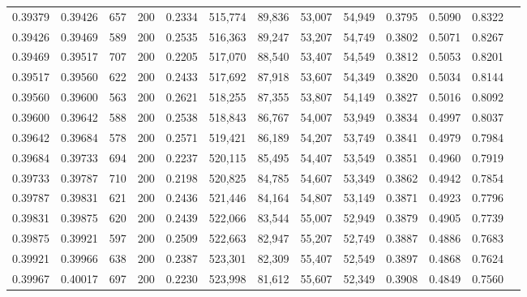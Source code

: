 \begin{tabular}{rrrrrrrrrrrrr}
0.39379 & 0.39426 &    657 & 200 &                                     0.2334 & 515,774 &  89,836 &  53,007 &  54,949 & 0.3795 & 0.5090 & 0.8322 \\
0.39426 & 0.39469 &    589 & 200 &                                     0.2535 & 516,363 &  89,247 &  53,207 &  54,749 & 0.3802 & 0.5071 & 0.8267 \\
0.39469 & 0.39517 &    707 & 200 &                                     0.2205 & 517,070 &  88,540 &  53,407 &  54,549 & 0.3812 & 0.5053 & 0.8201 \\
0.39517 & 0.39560 &    622 & 200 &                                     0.2433 & 517,692 &  87,918 &  53,607 &  54,349 & 0.3820 & 0.5034 & 0.8144 \\
0.39560 & 0.39600 &    563 & 200 &                                     0.2621 & 518,255 &  87,355 &  53,807 &  54,149 & 0.3827 & 0.5016 & 0.8092 \\
0.39600 & 0.39642 &    588 & 200 &                                     0.2538 & 518,843 &  86,767 &  54,007 &  53,949 & 0.3834 & 0.4997 & 0.8037 \\
0.39642 & 0.39684 &    578 & 200 &                                     0.2571 & 519,421 &  86,189 &  54,207 &  53,749 & 0.3841 & 0.4979 & 0.7984 \\
0.39684 & 0.39733 &    694 & 200 &                                     0.2237 & 520,115 &  85,495 &  54,407 &  53,549 & 0.3851 & 0.4960 & 0.7919 \\
0.39733 & 0.39787 &    710 & 200 &                                     0.2198 & 520,825 &  84,785 &  54,607 &  53,349 & 0.3862 & 0.4942 & 0.7854 \\
0.39787 & 0.39831 &    621 & 200 &                                     0.2436 & 521,446 &  84,164 &  54,807 &  53,149 & 0.3871 & 0.4923 & 0.7796 \\
0.39831 & 0.39875 &    620 & 200 &                                     0.2439 & 522,066 &  83,544 &  55,007 &  52,949 & 0.3879 & 0.4905 & 0.7739 \\
0.39875 & 0.39921 &    597 & 200 &                                     0.2509 & 522,663 &  82,947 &  55,207 &  52,749 & 0.3887 & 0.4886 & 0.7683 \\
0.39921 & 0.39966 &    638 & 200 &                                     0.2387 & 523,301 &  82,309 &  55,407 &  52,549 & 0.3897 & 0.4868 & 0.7624 \\
0.39967 & 0.40017 &    697 & 200 &                                     0.2230 & 523,998 &  81,612 &  55,607 &  52,349 & 0.3908 & 0.4849 & 0.7560 \\

\end{tabular}
